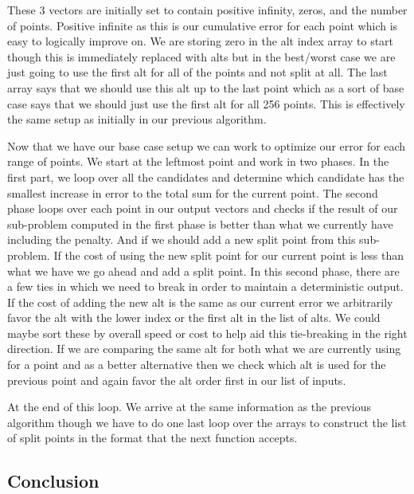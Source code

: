 \documentclass{article}
\begin{document}
These 3 vectors are initially set to contain positive infinity, zeros, and the number of points. Positive infinite as this is our cumulative error for each point which is easy to logically improve on. We are storing zero in the alt index array to start though this is immediately replaced with alts but in the best/worst case we are just going to use the first alt for all of the points and not split at all. The last array says that we should use this alt up to the last point which as a sort of base case says that we should just use the first alt for all 256 points. This is effectively the same setup as initially in our previous algorithm.

Now that we have our base case setup we can work to optimize our error for each range of points. We start at the leftmost point and work in two phases. In the first part, we loop over all the candidates and determine which candidate has the smallest increase in error to the total sum for the current point. The second phase loops over each point in our output vectors and checks if the result of our sub-problem computed in the first phase is better than what we currently have including the penalty. And if we should add a new split point from this sub-problem. If the cost of using the new split point for our current point is less than what we have we go ahead and add a split point. In this second phase, there are a few ties in which we need to break in order to maintain a deterministic output. If the cost of adding the new alt is the same as our current error we arbitrarily favor the alt with the lower index or the first alt in the list of alts. We could maybe sort these by overall speed or cost to help aid this tie-breaking in the right direction. If we are comparing the same alt for both what we are currently using for a point and as a better alternative then we check which alt is used for the previous point and again favor the alt order first in our list of inputs.

At the end of this loop. We arrive at the same information as the previous algorithm though we have to do one last loop over the arrays to construct the list of split points in the format that the next function accepts. 


\subsection{Conclusion}
\end{document}
